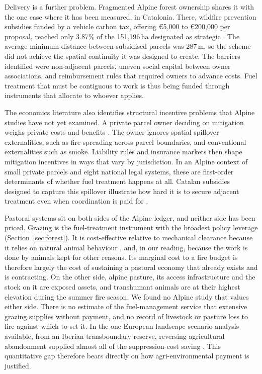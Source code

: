 \documentclass[11pt,a4paper]{article}
\begin{document}
Delivery is a further problem. Fragmented Alpine forest ownership shares it with the one case where it has been measured, in Catalonia. There, wildfire prevention subsidies funded by a vehicle carbon tax, offering €5{,}000 to €200{,}000 per proposal, reached only 3.87\% of the 151{,}196\,ha designated as strategic \citep{gorrizmifsud_current_2026}. The average minimum distance between subsidised parcels was 287\,m, so the scheme did not achieve the spatial continuity it was designed to create. The barriers identified were non-adjacent parcels, uneven social capital between owner associations, and reimbursement rules that required owners to advance costs. Fuel treatment that must be contiguous to work is thus being funded through instruments that allocate to whoever applies.

The economics literature also identifies structural incentive problems that Alpine studies have not yet examined. A private parcel owner deciding on mitigation weighs private costs and benefits \citep{bayham_economics_2022}. The owner ignores spatial spillover externalities, such as fire spreading across parcel boundaries, and conventional externalities such as smoke. Liability rules and insurance markets then shape mitigation incentives in ways that vary by jurisdiction. In an Alpine context of small private parcels and eight national legal systems, these are first-order determinants of whether fuel treatment happens at all. Catalan subsidies designed to capture this spillover illustrate how hard it is to secure adjacent treatment even when coordination is paid for \citep{gorrizmifsud_current_2026}.

Pastoral systems sit on both sides of the Alpine ledger, and neither side has been priced. Grazing is the fuel-treatment instrument with the broadest policy leverage (Section~\ref{sec:forest}). It is cost-effective relative to mechanical clearance because it relies on natural animal behaviour \citep{xu_how_2026}, and, in our reading, because the work is done by animals kept for other reasons. Its marginal cost to a fire budget is therefore largely the cost of sustaining a pastoral economy that already exists and is contracting. On the other side, alpine pasture, its access infrastructure and the stock on it are exposed assets, and transhumant animals are at their highest elevation during the summer fire season. We found no Alpine study that values either side. There is no estimate of the fuel-management service that extensive grazing supplies without payment, and no record of livestock or pasture loss to fire against which to set it. In the one European landscape scenario analysis available, from an Iberian transboundary reserve, reversing agricultural abandonment supplied almost all of the suppression-cost saving \citep{lecinadiaz_incorporating_2023}. This quantitative gap therefore bears directly on how agri-environmental payment is justified.
\end{document}
